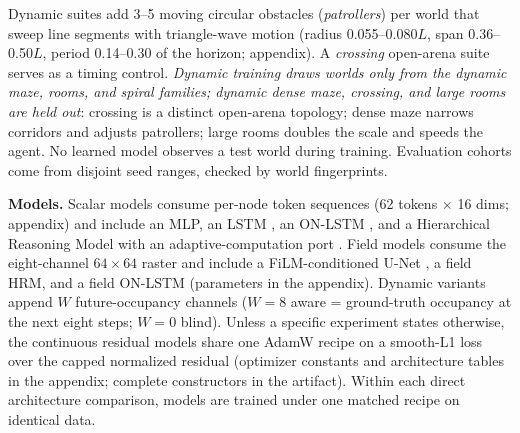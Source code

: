 \documentclass[letterpaper]{article} %
\begin{document}
Dynamic suites add 3--5 moving circular obstacles (\emph{patrollers}) per world that sweep line segments with triangle-wave motion (radius 0.055--0.080$L$, span 0.36--0.50$L$, period 0.14--0.30 of the horizon; appendix). A \emph{crossing} open-arena suite serves as a timing control. \emph{Dynamic training draws worlds only from the dynamic maze, rooms, and spiral families; dynamic dense maze, crossing, and large rooms are held out}: crossing is a distinct open-arena topology; dense maze narrows corridors and adjusts patrollers; large rooms doubles the scale and speeds the agent. No learned model observes a test world during training. Evaluation cohorts come from disjoint seed ranges, checked by world fingerprints.

\textbf{Models.} Scalar models consume per-node token sequences (62 tokens $\times$ 16 dims; appendix) and include an MLP, an LSTM \citep{hochreiter1997lstm}, an ON-LSTM \citep{shen2019onlstm}, and a Hierarchical Reasoning Model \citep[HRM;][]{wang2025hrm} with an adaptive-computation port \citep{graves2016act,banino2021pondernet}. Field models consume the eight-channel $64{\times}64$ raster and include a FiLM-conditioned U-Net \citep{ronneberger2015unet,perez2018film}, a field HRM, and a field ON-LSTM (parameters in the appendix). Dynamic variants append $W$ future-occupancy channels ($W{=}8$ aware = ground-truth occupancy at the next eight steps; $W{=}0$ blind). Unless a specific experiment states otherwise, the continuous residual models share one AdamW recipe on a smooth-L1 loss over the capped normalized residual (optimizer constants and architecture tables in the appendix; complete constructors in the artifact). Within each direct architecture comparison, models are trained under one matched recipe on identical data.
\end{document}
